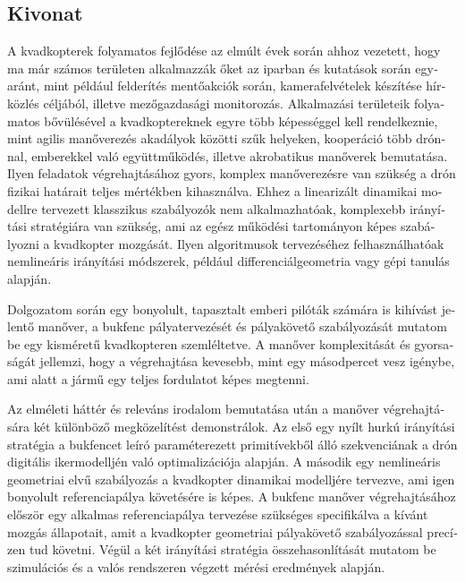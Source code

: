 \begin{otherlanguage}{magyar}
\section*{Kivonat}
A kvadkopterek folyamatos fejlődése az elmúlt évek során ahhoz vezetett, hogy ma már számos területen alkalmazzák őket az iparban és kutatások során egyaránt, mint például felderítés mentőakciók során, kamerafelvételek készítése hírközlés céljából, illetve mezőgazdasági monitorozás. Alkalmazási területeik folyamatos bővülésével a kvadkoptereknek egyre több képességgel kell rendelkeznie, mint agilis manőverezés akadályok közötti szűk helyeken, kooperáció több drónnal, emberekkel való együttműködés, illetve akrobatikus manőverek bemutatása. Ilyen feladatok végrehajtásához gyors, komplex manőverezésre van szükség a drón fizikai határait teljes mértékben kihasználva. Ehhez a linearizált dinamikai modellre tervezett klasszikus szabályozók nem alkalmazhatóak, komplexebb irányítási stratégiára van szükség, ami az egész működési tartományon képes szabályozni a kvadkopter mozgását. Ilyen algoritmusok tervezéséhez felhasználhatóak nemlineáris irányítási módszerek, például differenciálgeometria vagy gépi tanulás alapján.


Dolgozatom során egy bonyolult, tapasztalt emberi pilóták számára is kihívást jelentő manőver, a bukfenc pályatervezését és pályakövető szabályozását mutatom be egy kisméretű kvadkopteren szemléltetve. A manőver komplexitását és gyorsaságát jellemzi, hogy a végrehajtása kevesebb, mint egy másodpercet vesz igénybe, ami alatt a jármű egy teljes fordulatot képes megtenni.

Az elméleti háttér és releváns irodalom bemutatása után a manőver végrehajtására két különböző megközelítést demonstrálok. Az első egy nyílt hurkú irányítási stratégia a bukfencet leíró paraméterezett primitívekből álló szekvenciának a drón digitális ikermodelljén való optimalizációja alapján. A második egy nemlineáris geometriai elvű szabályozás a kvadkopter dinamikai modelljére tervezve, ami igen bonyolult referenciapálya követésére is képes. A bukfenc manőver végrehajtásához először egy alkalmas referenciapálya tervezése szükséges specifikálva a kívánt mozgás állapotait, amit a kvadkopter geometriai pályakövető szabályozással precízen tud követni. Végül a két irányítási stratégia összehasonlítását mutatom be szimulációs és a valós rendszeren végzett mérési eredmények alapján.
\pagebreak
\end{otherlanguage}